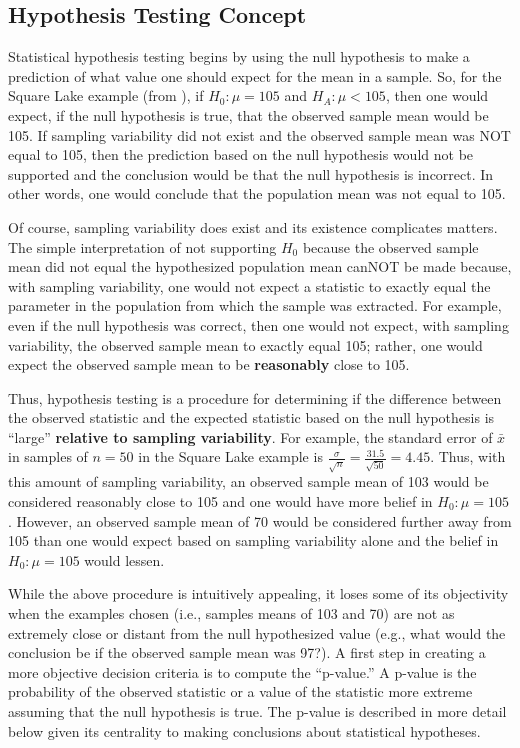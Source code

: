 \documentclass[10pt,openany]{book}\usepackage[]{graphicx}\usepackage[]{color}
\begin{document}
\subsection{Hypothesis Testing Concept}
\vspace{-12pt}
Statistical hypothesis testing begins by using the null hypothesis to make a prediction of what value one should expect for the mean in a sample.  So, for the Square Lake example (from ), if $H_{0}:\mu=105$ and $H_{A}:\mu<105$, then one would expect, if the null hypothesis is true, that the observed sample mean would be 105.  If sampling variability did not exist and the observed sample mean was NOT equal to 105, then the prediction based on the null hypothesis would not be supported and the conclusion would be that the null hypothesis is incorrect.  In other words, one would conclude that the population mean was not equal to 105.

Of course, sampling variability does exist and its existence complicates matters.  The simple interpretation of not supporting $H_{0}$ because the observed sample mean did not equal the hypothesized population mean canNOT be made because, with sampling variability, one would not expect a statistic to exactly equal the parameter in the population from which the sample was extracted.  For example, even if the null hypothesis was correct, then one would not expect, with sampling variability, the observed sample mean to exactly equal 105; rather, one would expect the observed sample mean to be \textbf{reasonably} close to 105.

Thus, hypothesis testing is a procedure for determining if the difference between the observed statistic and the expected statistic based on the null hypothesis is ``large'' \textbf{relative to sampling variability}.  For example, the standard error of $\bar{x}$ in samples of $n=50$ in the Square Lake example is $\frac{\sigma}{\sqrt{n}}=$$\frac{31.5}{\sqrt{50}}$$=4.45$.  Thus, with this amount of sampling variability, an observed sample mean of 103 would be considered reasonably close to 105 and one would have more belief in $H_{0}:\mu=105$.  However, an observed sample mean of 70 would be considered further away from 105 than one would expect based on sampling variability alone and the belief in $H_{0}:\mu=105$ would lessen.

While the above procedure is intuitively appealing, it loses some of its objectivity when the examples chosen (i.e., samples means of 103 and 70) are not as extremely close or distant from the null hypothesized value (e.g., what would the conclusion be if the observed sample mean was 97?).  A first step in creating a more objective decision criteria is to compute the ``p-value.''  A p-value is the probability of the observed statistic or a value of the statistic more extreme assuming that the null hypothesis is true.  The p-value is described in more detail below given its centrality to making conclusions about statistical hypotheses.
\end{document}
